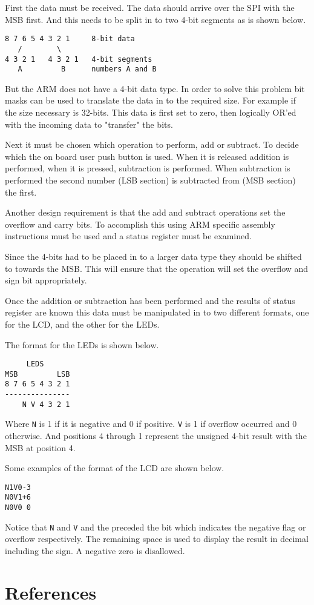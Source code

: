 \documentclass{article}
\begin{document}
First the data must be received.
The data should arrive over the SPI with the MSB first.
And this needs to be split in to two 4-bit segments
as is shown below.

\begin{verbatim}
8 7 6 5 4 3 2 1     8-bit data
   /        \
4 3 2 1   4 3 2 1   4-bit segments
   A         B      numbers A and B
\end{verbatim}

But the ARM does not have a 4-bit data type.
In order to solve this problem bit masks can be used to
translate the data in to the required size.
For example if the size necessary is 32-bits.
This data is first set to zero, then logically OR'ed with
the incoming data to "transfer" the bits.

Next it must be chosen which operation to perform, add or subtract.
To decide which the on board user push button\cite[Pg. 17]{UM1079}
is used.  When it is released addition is performed, when it
is pressed, subtraction is performed.
When subtraction is performed the second number (LSB section)
is subtracted from (MSB section) the first.


Another design requirement is that the add and subtract operations
set the overflow and carry bits.
To accomplish this using ARM specific assembly instructions
must be used \cite[Pg. 54]{furber2000arm} and a status
register must be examined\cite[Pg. 40]{furber2000arm}.

Since the 4-bits had to be placed in to a larger data type
they should be shifted to towards the MSB.
This will ensure that the operation will set the overflow and
sign bit appropriately.

Once the addition or subtraction has been performed and the
results of status register are known this data must be
manipulated in to two different formats, one for the LCD,
and the other for the LEDs.

The format for the LEDs is shown below.
\begin{verbatim}
     LEDS
MSB         LSB
8 7 6 5 4 3 2 1
---------------
    N V 4 3 2 1 
\end{verbatim}
Where \verb+N+ is 1 if it is negative and 0 if positive.
\verb+V+ is 1 if overflow occurred and 0 otherwise.
And positions 4 through 1 represent the unsigned 4-bit result
with the MSB at position 4.

Some examples of the format of the LCD are shown below.
\begin{verbatim}
N1V0-3
N0V1+6
N0V0 0
\end{verbatim}
Notice that \verb+N+ and \verb+V+ and the preceded the bit which
indicates the negative flag or overflow respectively.
The remaining space is used to display the result in decimal including the sign.
A negative zero is disallowed.


\clearpage

\pagebreak
\renewcommand*{\refname}{\vspace{-8mm}}
\section{References}
%


\end{document}
